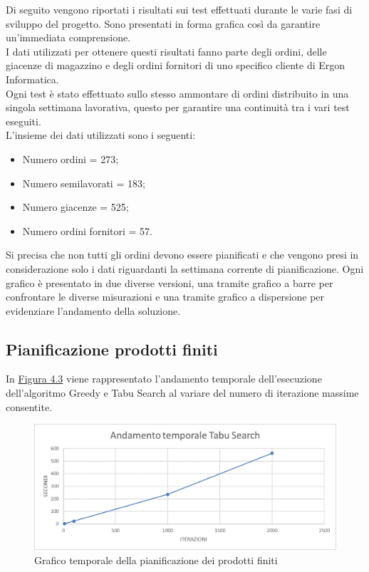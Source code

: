 Di seguito vengono riportati i risultati sui test effettuati durante le varie fasi di sviluppo del progetto. Sono presentati in forma grafica così da garantire un'immediata
comprensione.\\ I dati utilizzati per ottenere questi risultati fanno parte degli ordini, delle giacenze di magazzino 
e degli ordini fornitori di uno specifico cliente di Ergon Informatica.\\
Ogni test è stato effettuato sullo stesso ammontare di ordini distribuito in una singola settimana lavorativa, questo per garantire una continuità tra i vari test eseguiti.\\
L'insieme dei dati utilizzati sono i seguenti:
\begin{itemize}
    \item Numero ordini = 273;
    \item Numero semilavorati = 183;
    \item Numero giacenze = 525;
    \item Numero ordini fornitori = 57.
\end{itemize}

Si precisa che non tutti gli ordini devono essere pianificati e che vengono presi in considerazione solo i dati riguardanti la settimana corrente di pianificazione.
Ogni grafico è presentato in due diverse versioni, una tramite grafico a barre per confrontare le diverse misurazioni e una tramite grafico a dispersione per evidenziare
l'andamento della soluzione.
\subsection{Pianificazione prodotti finiti}

In \hyperref[4.3]{Figura 4.3} viene rappresentato l'andamento temporale dell'esecuzione dell'algoritmo Greedy e Tabu Search al variare del numero di iterazione massime consentite.

\begin{figure}[H]
	\includegraphics[width=13cm]{immagini/graficoPF2.png}
	\centering
	\caption{Grafico temporale della pianificazione dei prodotti finiti}
    \label{4.3}
\end{figure}

